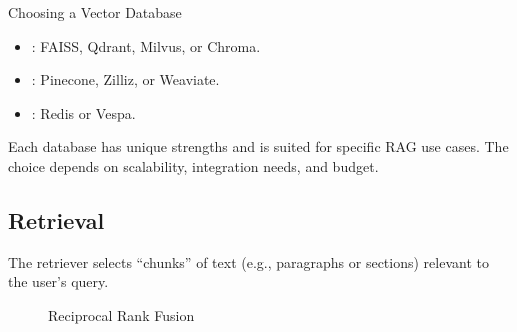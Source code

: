 \documentclass[letterpaper,11pt,english]{sphinxmanual}
\begin{document}
\sphinxAtStartPar
Choosing a Vector Database
\begin{itemize}
\item {} 
\sphinxAtStartPar
{}: FAISS, Qdrant, Milvus, or Chroma.

\item {} 
\sphinxAtStartPar
{}: Pinecone, Zilliz, or Weaviate.

\item {} 
\sphinxAtStartPar
{}: Redis or Vespa.

\end{itemize}

\sphinxAtStartPar
Each database has unique strengths and is suited for specific RAG use cases. The choice depends on scalability, integration needs, and budget.


\subsection{Retrieval}
\label{\detokenize{rag:retrieval}}
\sphinxAtStartPar
The retriever selects “chunks” of text (e.g., paragraphs or sections) relevant to the user’s query.

\begin{figure}[htbp]
\centering
\capstart

\noindent{}
\caption{Reciprocal Rank Fusion}\label{\detokenize{rag:id40}}\label{\detokenize{rag:fig-retriever}}\end{figure}
\end{document}
